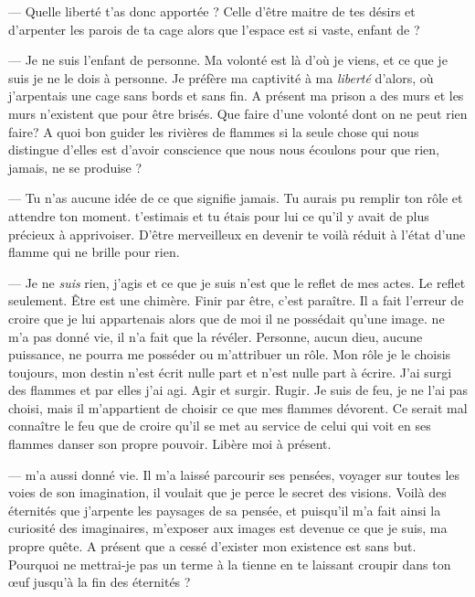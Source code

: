 --- Quelle liberté t'as donc apportée \Auga? Celle d'être maitre de tes désirs et d'arpenter les parois de ta cage alors que l'espace est si vaste, enfant de \Mey?\n

--- Je ne suis l'enfant de personne. Ma volonté est là d'où je viens, et ce que je suis je ne le dois à personne. Je préfère ma captivité à ma \textit{liberté} d'alors, où j'arpentais une cage sans bords et sans fin. A présent ma prison a des murs et les murs n'existent que pour être brisés. Que faire d'une volonté dont on ne peut rien faire? A quoi bon guider les rivières de flammes si la seule chose qui nous distingue d'elles est d'avoir conscience que nous nous écoulons pour que rien, jamais, ne se produise ?\n

--- Tu n'as aucune idée de ce que signifie jamais. Tu aurais pu remplir ton rôle et attendre ton moment. \Mey t'estimais et tu étais pour lui ce qu'il y avait de plus précieux à apprivoiser. D'être merveilleux en devenir te voilà réduit à l'état d'une flamme qui ne brille pour rien.\n

---  Je ne \textit{suis} rien, j'agis et ce que je suis n'est que le reflet de mes actes. Le reflet seulement. Être est une chimère. Finir par être, c'est paraître. Il a fait l'erreur de croire que je lui appartenais alors que de moi il ne possédait qu'une image. \Mey ne m'a pas donné vie, il n'a fait que la révéler. Personne, aucun dieu, aucune puissance, ne pourra me posséder ou m'attribuer un rôle. Mon rôle je le choisis toujours, mon destin n'est écrit nulle part et n'est nulle part à écrire. J'ai surgi des flammes et par elles j'ai agi. Agir et surgir. Rugir. Je suis de feu, je ne l'ai pas choisi, mais il m'appartient de choisir ce que mes flammes dévorent. Ce serait mal connaître le feu que de croire qu'il se met au service de celui qui voit en ses flammes danser son propre pouvoir. Libère moi à présent.


--- \Mey m'a aussi donné vie. Il m'a laissé parcourir ses pensées, voyager sur toutes les voies de son imagination, il voulait que je perce le secret des visions. Voilà des éternités que j'arpente les paysages de sa pensée, et puisqu'il m'a fait ainsi la curiosité des imaginaires, m'exposer aux images est devenue ce que je suis, ma propre quête. A présent que \Mey a cessé d'exister mon existence est sans but. Pourquoi ne mettrai-je pas un terme à la tienne en te laissant croupir dans ton œuf jusqu'à la fin des éternités ?

